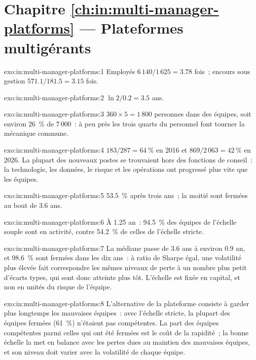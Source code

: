 \section*{Chapitre \ref{ch:in:multi-manager-platforms} --- Plateformes multigérants}

\begin{solution}{exo:in:multi-manager-platforms:1}
Employés $6\,140/1\,625=3.78$ fois~; encours sous gestion $571.1/181.5=3.15$ fois.
\end{solution}

\begin{solution}{exo:in:multi-manager-platforms:2}
$\ln2/0.2=3.5$ ans.
\end{solution}

\begin{solution}{exo:in:multi-manager-platforms:3}
$360\times5=1\,800$ personnes dans des équipes, soit environ 26~\% de 7\,000~: à peu près les trois quarts du personnel font tourner la mécanique commune.
\end{solution}

\begin{solution}{exo:in:multi-manager-platforms:4}
$183/287=64~\%$ en 2016 et $869/2\,063=42~\%$ en 2026. La plupart des nouveaux postes se trouvaient hors des fonctions de conseil~: la technologie,
les données, le risque et les opérations ont progressé plus vite que les équipes.
\end{solution}

\begin{solution}{exo:in:multi-manager-platforms:5}
53.5~\% après trois ans~; la moitié sont fermées au bout de 3.6 ans.
\end{solution}

\begin{solution}{exo:in:multi-manager-platforms:6}
À 1.25 an~: 94.5~\% des équipes de l'échelle souple sont en activité, contre 54.2~\% de celles de l'échelle stricte.
\end{solution}

\begin{solution}{exo:in:multi-manager-platforms:7}
La médiane passe de 3.6 ans à environ 0.9 an, et 98.6~\% sont fermées dans les dix ans~: à ratio de Sharpe égal,
une volatilité plus élevée fait correspondre les mêmes niveaux de perte à un nombre plus petit d'écarts types, qui sont donc atteints plus tôt.
L'échelle est fixée en capital, et non en unités du risque de l'équipe.
\end{solution}

\begin{solution}{exo:in:multi-manager-platforms:8}
L'alternative de la plateforme consiste à garder plus longtemps les mauvaises équipes~: avec l'échelle stricte, la plupart des équipes fermées (61~\%) n'étaient pas
compétentes. La part des équipes compétentes parmi celles qui ont été fermées est le coût de la rapidité~; la bonne échelle la met en balance avec les pertes
dues au maintien des mauvaises équipes, et son niveau doit varier avec la volatilité de chaque équipe.
\end{solution}

